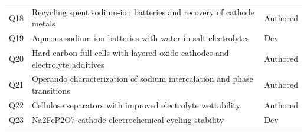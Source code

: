 \begin{longtable}{lp{.67\linewidth}l}
Q18 & Recycling spent sodium-ion batteries and recovery of cathode metals & Authored \\
Q19 & Aqueous sodium-ion batteries with water-in-salt electrolytes & Dev \\
Q20 & Hard carbon full cells with layered oxide cathodes and electrolyte additives & Authored \\
Q21 & Operando characterization of sodium intercalation and phase transitions & Authored \\
Q22 & Cellulose separators with improved electrolyte wettability & Authored \\
Q23 & Na2FeP2O7 cathode electrochemical cycling stability & Dev \\
\end{longtable}\endgroup
{}
